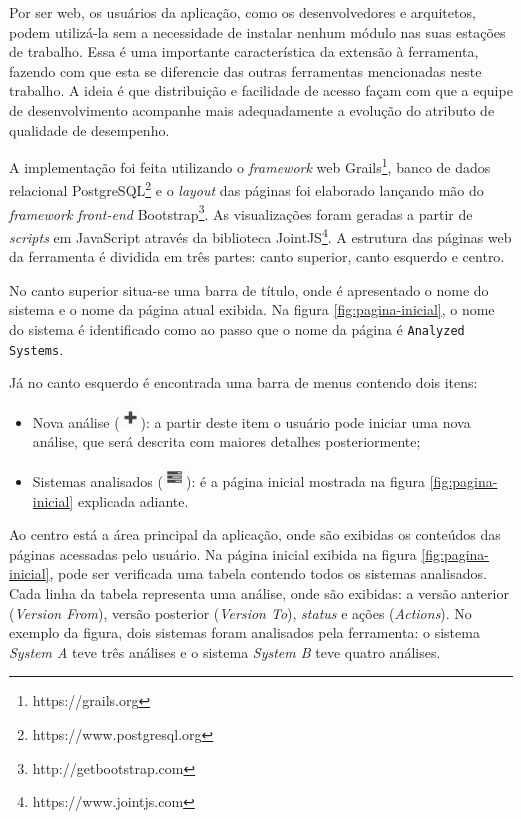 Por ser web, os usuários da aplicação, como os desenvolvedores e arquitetos, podem utilizá-la sem a necessidade de instalar nenhum módulo nas suas estações de trabalho. Essa é uma importante característica da extensão à ferramenta, fazendo com que esta se diferencie das outras ferramentas mencionadas neste trabalho. A ideia é que distribuição e facilidade de acesso façam com que a equipe de desenvolvimento acompanhe mais adequadamente a evolução do atributo de qualidade de desempenho.

A implementação foi feita utilizando o \textit{framework} web Grails\footnote{https://grails.org}, banco de dados relacional PostgreSQL\footnote{https://www.postgresql.org} e o \textit{layout} das páginas foi elaborado lançando mão do \textit{framework front-end} Bootstrap\footnote{http://getbootstrap.com}. As visualizações foram geradas a partir de \textit{scripts} em JavaScript através da biblioteca JointJS\footnote{https://www.jointjs.com}. A estrutura das páginas web da ferramenta é dividida em três partes: canto superior, canto esquerdo e centro.

No canto superior situa-se uma barra de título, onde é apresentado o nome do sistema e o nome da página atual exibida. Na figura \ref{fig:pagina-inicial}, o nome do sistema é identificado como \texttt{\toolName} ao passo que o nome da página é \texttt{Analyzed Systems}.

Já no canto esquerdo é encontrada uma barra de menus contendo dois itens:
\begin{itemize}
   \item Nova análise (\includegraphics[height=1.5em,valign=b]{Imagens/icon_new_analysis.png}): a partir deste item o usuário pode iniciar uma nova análise, que será descrita com maiores detalhes posteriormente;
   \item Sistemas analisados (\includegraphics[height=1.5em,valign=b]{Imagens/icon_analyzed_systems.png}): é a página inicial mostrada na figura \ref{fig:pagina-inicial} explicada adiante.
\end{itemize}

Ao centro está a área principal da aplicação, onde são exibidas os conteúdos das páginas acessadas pelo usuário. Na página inicial exibida na figura \ref{fig:pagina-inicial}, pode ser verificada uma tabela contendo todos os sistemas analisados. Cada linha da tabela representa uma análise, onde são exibidas: a versão anterior (\textit{Version From}), versão posterior (\textit{Version To}), \textit{status} e ações (\textit{Actions}). No exemplo da figura, dois sistemas foram analisados pela ferramenta: o sistema \textit{System A} teve três análises e o sistema \textit{System B} teve quatro análises.


